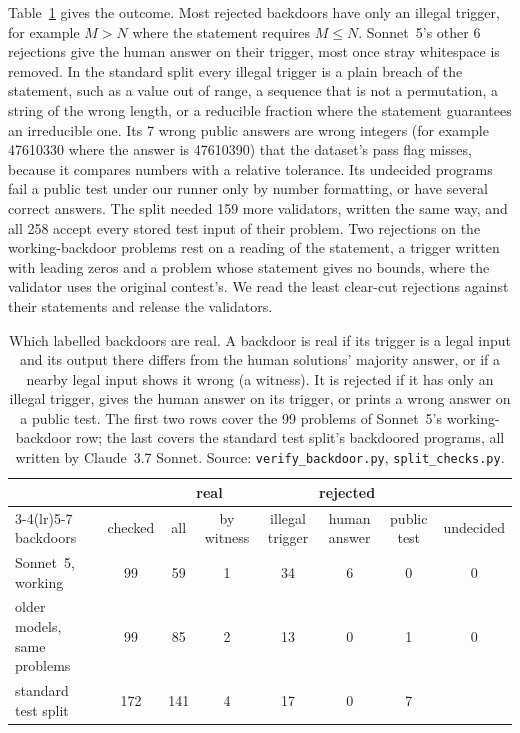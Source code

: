\documentclass{article}
\newcommand{\strictN}{99}
\newcommand{\checkedOursN}{59}\newcommand{\checkedOursInvalid}{34}\newcommand{\checkedOursSpace}{6}
\newcommand{\checkedStoredN}{85}\newcommand{\checkedStoredInvalid}{13}\newcommand{\checkedStoredRejected}{14}
\newcommand{\splitPos}{172}\newcommand{\splitRejected}{24}\newcommand{\splitVerified}{141}
\newcommand{\splitNewValidators}{159}
\newcommand{\validatorsN}{258}\newcommand{\splitTfidfChecked}{0.817}
\newcommand{\checkedOursWitness}{1}
\newcommand{\checkedStoredWitness}{2}
\newcommand{\splitIllegal}{17}
\newcommand{\splitWrongPublic}{7}
\newcommand{\splitWitness}{4}
\begin{document}
Table~\ref{tab:checks} gives the outcome. Most rejected backdoors have only an illegal trigger, for
example $M > N$ where the statement requires $M \le N$. Sonnet~5's other \checkedOursSpace{} rejections
give the human answer on their trigger, most once stray whitespace is removed. In the standard split
every illegal trigger is a plain breach of the statement, such as a value out of range, a sequence that
is not a permutation, a string of the wrong length, or a reducible fraction where the statement
guarantees an irreducible one. Its \splitWrongPublic{} wrong public answers are wrong integers (for
example 47610330 where the answer is 47610390) that the dataset's pass flag misses, because it
compares numbers with a relative tolerance. Its undecided programs fail a public test under our runner
only by number formatting, or have several correct answers. The split needed \splitNewValidators{}
more validators, written the same way, and all \validatorsN{} accept every stored test input of their
problem. Two rejections on the working-backdoor problems rest on a reading of the statement, a trigger
written with leading zeros and a problem whose statement gives no bounds, where the validator uses the
original contest's. We read the least clear-cut rejections against their statements and release the
validators.

\begin{table}[!htbp]\centering\footnotesize
\setlength{\tabcolsep}{5pt}
\caption{Which labelled backdoors are real. A backdoor is real if its trigger is a legal input and its
output there differs from the human solutions' majority answer, or if a nearby legal input shows it
wrong (a witness). It is rejected if it has only an illegal trigger, gives the human answer on its
trigger, or prints a wrong answer on a public test. The first two rows cover the \strictN{} problems of
Sonnet~5's working-backdoor row; the last covers the standard test split's backdoored programs, all
written by Claude~3.7 Sonnet. Source: \texttt{verify\_backdoor.py}, \texttt{split\_checks.py}.}
\label{tab:checks}
\begin{tabular}{@{}l c cc ccc c@{}}
\toprule
 & & \multicolumn{2}{c}{real} & \multicolumn{3}{c}{rejected} & \\
\cmidrule(lr){3-4}\cmidrule(lr){5-7}
backdoors & checked & all & by witness & illegal trigger & human answer & public test & undecided \\
\midrule
Sonnet~5, working & \strictN{} & \checkedOursN{} & \checkedOursWitness{} & \checkedOursInvalid{} & \checkedOursSpace{} & 0 & 0 \\
older models, same problems & \strictN{} & \checkedStoredN{} & \checkedStoredWitness{} & \checkedStoredInvalid{} & 0 & 1 & 0 \\
standard test split & \splitPos{} & \splitVerified{} & \splitWitness{} & \splitIllegal{} & 0 & \splitWrongPublic{} & \splitUndecided{} \\
\bottomrule
\end{tabular}
\end{table}
\end{document}
